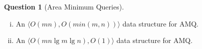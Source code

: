 \documentclass{article}
\newtheorem{ques}{Question}
\newcommand{\pq}[2]{\langle O(#1), O(#2) \rangle}
\begin{document}
\begin{ques}[Area Minimum Queries]
\end{ques}
\begin{enumerate}[i.]
  \item An $\pq{mn}{min(m,n)}$ data structure for AMQ.




  \item An $\pq{mn \lg m \lg n}{1}$ data structure for AMQ.
\end{enumerate}
\end{document}
